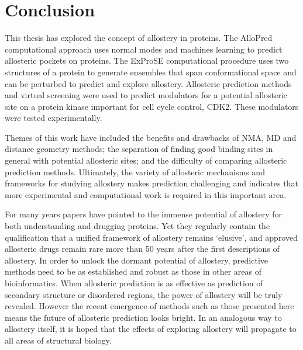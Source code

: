 \chapter{Conclusion}
\label{cha:conclusion}

This thesis has explored the concept of allostery in proteins.
The AlloPred computational approach uses normal modes and machines learning to predict allosteric pockets on proteins.
The ExProSE computational procedure uses two structures of a protein to generate ensembles that span conformational space and can be perturbed to predict and explore allostery.
Allosteric prediction methods and virtual screening were used to predict modulators for a potential allosteric site on a protein kinase important for cell cycle control, CDK2.
These modulators were tested experimentally.

Themes of this work have included the benefits and drawbacks of NMA, MD and distance geometry methods; the separation of finding good binding sites in general with potential allosteric sites; and the difficulty of comparing allosteric prediction methods.
Ultimately, the variety of allosteric mechanisms and frameworks for studying allostery makes prediction challenging and indicates that more experimental and computational work is required in this important area.

For many years papers have pointed to the immense potential of allostery for both understanding and drugging proteins.
Yet they regularly contain the qualification that a unified framework of allostery remains `elusive', and approved allosteric drugs remain rare more than 50 years after the first descriptions of allostery.
In order to unlock the dormant potential of allostery, predictive methods need to be as established and robust as those in other areas of bioinformatics.
When allosteric prediction is as effective as prediction of secondary structure or disordered regions, the power of allostery will be truly revealed.
However the recent emergence of methods such as those presented here means the future of allosteric prediction looks bright.
In an analogous way to allostery itself, it is hoped that the effects of exploring allostery will propagate to all areas of structural biology.
